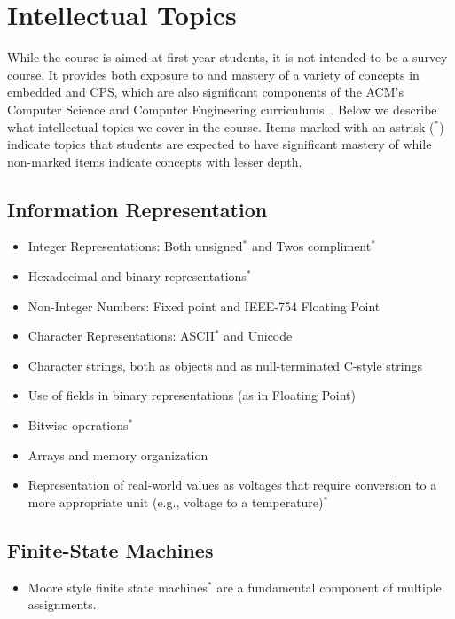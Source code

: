 \section{Intellectual Topics}
\label{sec:topics}

While the course is aimed at first-year students, it is not intended to be a survey course.  It provides both exposure to and mastery of a variety of concepts in embedded and CPS, which are also significant components of the ACM's Computer Science and Computer Engineering curriculums~\cite{cs13,ce16}.  Below we describe what intellectual topics we cover in the course.  Items marked with an astrisk ($^*$)   indicate topics that students are expected to have significant mastery of while non-marked items indicate concepts with lesser depth.

\subsection{Information Representation}
\label{sec:ip}
\begin{itemize}
  \item Integer Representations: Both unsigned$^*$ and Twos compliment$^*$
  \item Hexadecimal and binary representations$^*$
  \item Non-Integer Numbers: Fixed point and IEEE-754 Floating Point
  \item Character Representations: ASCII$^*$ and Unicode
  \item Character strings, both as objects and as null-terminated C-style strings
  \item Use of fields in binary representations (as in Floating Point)
  \item Bitwise operations$^*$
  \item Arrays and memory organization
  \item Representation of real-world values as voltages that require conversion to a more appropriate unit (e.g., voltage to a temperature)$^*$
\end{itemize}

\subsection{Finite-State Machines}
\label{sec:fsm}
\begin{itemize}
\item Moore style finite state machines$^*$ are a fundamental component of multiple assignments.
\end{itemize}

